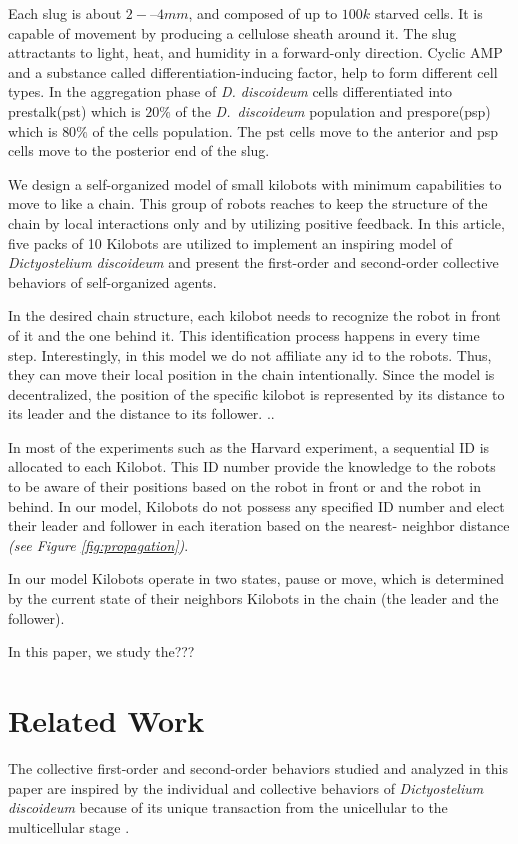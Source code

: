 \documentclass[11pt,a4paper]{article}
\begin{document}
Each slug is about $2-–4 mm$, and composed of up to $100k$ starved cells. It is capable of movement by producing a cellulose sheath around it. The slug attractants to light, heat, and humidity in a forward-only direction. Cyclic AMP and a substance called differentiation-inducing factor, help to form different cell types. In the aggregation phase of \textit{D. discoideum} cells differentiated into prestalk(pst) which is $20\%$ of the \textit{D.~discoideum} population and prespore(psp) which is $80\%$ of the cells population. The pst cells move to the anterior and psp cells move to the posterior end of the slug.

We design a self-organized model of small kilobots with minimum capabilities to move to like a chain. This group of robots reaches to keep the structure of the chain by local interactions only and by utilizing positive feedback.   In this article, five packs of 10 Kilobots are utilized to implement an inspiring model of \textit{Dictyostelium discoideum} and present the first-order and second-order collective behaviors of self-organized agents.  

In the desired chain structure, each kilobot needs to recognize the robot in front of it and the one behind it. This identification process happens in every time step. Interestingly, in this model we do not affiliate any id to the robots. Thus, they can move their local position in the chain intentionally. Since the model is decentralized, the position of the specific kilobot is represented by its distance to its leader and the distance to its follower. ..

In most of the experiments such as the Harvard experiment, a sequential ID  is allocated to each Kilobot. This ID number provide the knowledge to the robots to be aware of their positions based on the robot in front or and the robot in behind. In our model, Kilobots do not possess any specified ID number and elect their leader and follower in each iteration based on the nearest- neighbor distance \textit{(see Figure \ref{fig:propagation})}. 


In our model Kilobots operate in two states, pause or move, which is determined by the current state of their neighbors Kilobots in the chain (the leader and the follower). 

In this paper, we study the???
\section{Related Work} 
The collective first-order and second-order behaviors studied and analyzed in this paper are inspired by the individual and collective behaviors of \textit{Dictyostelium discoideum} because of its unique transaction from the unicellular to the multicellular stage \cite{loomis2012dictyostelium, maeda2005regulation}. 
\end{document}
